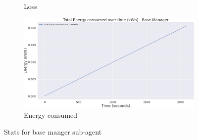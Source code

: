 \begin{figure}[h]
\begin{subfigure}[b]{0.495\textwidth}
        \caption{Loss}
    \end{subfigure}
    \begin{subfigure}[b]{0.495\textwidth}
        \includegraphics[width=1\textwidth]{figs/multi_dqn_base_manager/energy_consumed.png}
        \caption{Energy consumed}
    \end{subfigure}
    \caption{Stats for base manger sub-agent}
\end{figure}

